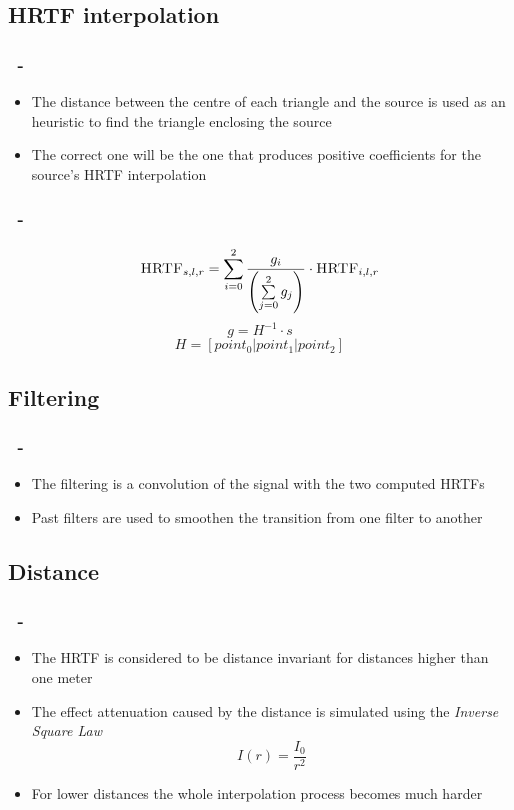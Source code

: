 \documentclass{beamer}
\begin{document}
	\subsection{\textsc{HRTF} interpolation}

	\begin{frame}
		\frametitle{\insertsection\ - \insertsubsection}
		\begin{itemize}
			\item The distance between the centre of each triangle and the source is used as an heuristic to find the triangle enclosing the source
			\item The correct one will be the one that produces positive coefficients for the source's \textsc{HRTF} interpolation
		\end{itemize}
	\end{frame}

	\begin{frame}
		\frametitle{\insertsection\ - \insertsubsection}
		$$ \textsc{HRTF}_{s,l,r} = \sum\limits_{i=0}^2 \dfrac{ g_i } { \left( \sum\limits_{j=0}^2 g_j \right) } \cdot \textsc{HRTF}_{i,l,r} $$
		$$ g = H^{-1} \cdot s $$
		$$ H = [ point_0 | point_1 | point_2 ] $$
	\end{frame}
	
	\subsection{Filtering}

	\begin{frame}
		\frametitle{\insertsection\ - \insertsubsection}
		\begin{itemize}
			\item The filtering is a convolution of the signal with the two computed \textsc{HRTF}s
			\item Past filters are used to smoothen the transition from one filter to another
		\end{itemize}
	\end{frame}

	\subsection{Distance}

	\begin{frame}
		\frametitle{\insertsection\ - \insertsubsection}
        \begin{itemize}
          \item The \textsc{HRTF} is considered to be distance invariant for distances higher than one meter
          \item The effect attenuation caused by the distance is simulated using the {\em Inverse Square Law}
            $$ I(r) = \frac{I_{0}}{r^2} $$
          \item For lower distances the whole interpolation process becomes much harder
      \end{itemize}
	\end{frame}
\end{document}
